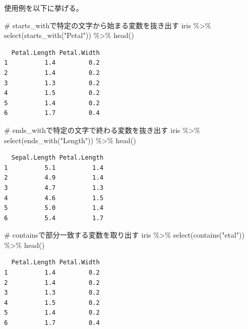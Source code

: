 \documentclass[
  a4paper,
]{ltjsbook}
\newenvironment{Shaded}{\begin{snugshade}}{\end{snugshade}}
\newcommand{\CommentTok}[1]{\textcolor[rgb]{0.37,0.37,0.37}{#1}}
\newcommand{\FunctionTok}[1]{\textcolor[rgb]{0.28,0.35,0.67}{#1}}
\newcommand{\NormalTok}[1]{\textcolor[rgb]{0.00,0.23,0.31}{#1}}
\newcommand{\SpecialCharTok}[1]{\textcolor[rgb]{0.37,0.37,0.37}{#1}}
\newcommand{\StringTok}[1]{\textcolor[rgb]{0.13,0.47,0.30}{#1}}
\begin{document}
使用例を以下に挙げる。

\begin{Shaded}
\begin{Highlighting}[]
\CommentTok{\# starts\_withで特定の文字から始まる変数を抜き出す}
\NormalTok{iris }\SpecialCharTok{\%\textgreater{}\%} \FunctionTok{select}\NormalTok{(}\FunctionTok{starts\_with}\NormalTok{(}\StringTok{"Petal"}\NormalTok{)) }\SpecialCharTok{\%\textgreater{}\%} \FunctionTok{head}\NormalTok{()}
\end{Highlighting}
\end{Shaded}

\begin{verbatim}
  Petal.Length Petal.Width
1          1.4         0.2
2          1.4         0.2
3          1.3         0.2
4          1.5         0.2
5          1.4         0.2
6          1.7         0.4
\end{verbatim}

\begin{Shaded}
\begin{Highlighting}[]
\CommentTok{\# ends\_withで特定の文字で終わる変数を抜き出す}
\NormalTok{iris }\SpecialCharTok{\%\textgreater{}\%} \FunctionTok{select}\NormalTok{(}\FunctionTok{ends\_with}\NormalTok{(}\StringTok{"Length"}\NormalTok{)) }\SpecialCharTok{\%\textgreater{}\%} \FunctionTok{head}\NormalTok{()}
\end{Highlighting}
\end{Shaded}

\begin{verbatim}
  Sepal.Length Petal.Length
1          5.1          1.4
2          4.9          1.4
3          4.7          1.3
4          4.6          1.5
5          5.0          1.4
6          5.4          1.7
\end{verbatim}

\begin{Shaded}
\begin{Highlighting}[]
\CommentTok{\# containsで部分一致する変数を取り出す}
\NormalTok{iris }\SpecialCharTok{\%\textgreater{}\%} \FunctionTok{select}\NormalTok{(}\FunctionTok{contains}\NormalTok{(}\StringTok{"etal"}\NormalTok{)) }\SpecialCharTok{\%\textgreater{}\%} \FunctionTok{head}\NormalTok{()}
\end{Highlighting}
\end{Shaded}

\begin{verbatim}
  Petal.Length Petal.Width
1          1.4         0.2
2          1.4         0.2
3          1.3         0.2
4          1.5         0.2
5          1.4         0.2
6          1.7         0.4
\end{verbatim}
\end{document}

